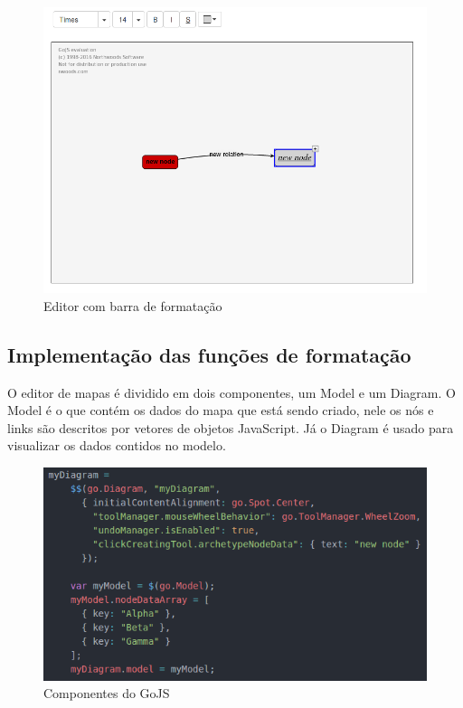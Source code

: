 \documentclass[
	12pt,				%
	openright,			%
	oneside,			%
	a4paper,			%
	english,			%
	french,				%
	spanish,			%
	brazil				%
	]{abntex2}
\begin{document}
\begin{figure}[htb]
	\caption{\label{fig_barraformacao} Editor com barra de formatação}
	\begin{center}
		\includegraphics[scale=0.5]{barraformacao.png}
	\end{center}
\end{figure}

\subsection{Implementação das funções de formatação}
O editor de mapas é dividido em dois componentes, um Model e um Diagram. O Model é o que contém os dados do mapa que está sendo criado, nele os nós e links são descritos por vetores de objetos JavaScript. Já o Diagram é usado para visualizar os dados contidos no modelo.
\begin{figure}[htb]
	\caption{\label{fig_gojs} Componentes do GoJS}
	\begin{center}
		\includegraphics[scale=0.7]{gojs.png}
	\end{center}
\end{figure}
\end{document}
